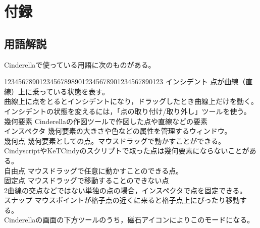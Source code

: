 \documentclass[papersize,a4paper,12pt,uplatex]{jsarticle}
\begin{document}
\section{付録}

\subsection{用語解説} 
Cinderellaで使っている用語に次のものがある。
\begin{tabbing}
1234567890123\=456789890123456789012\=34567890123\=\kill
インシデント  \>点が曲線（直線）上に乗っている状態を表す。\\
  \>曲線上に点をとるとインシデントになり，ドラッグしたとき曲線上だけを動く。\\
  \>インシデントの状態を変えるには，「点の取り付け/取り外し」ツールを使う。\\
幾何要素      \>Cinderellaの作図ツールで作図した点や直線などの要素\\
インスペクタ  \>幾何要素の大きさや色などの属性を管理するウィンドウ。\\
幾何点    \>幾何要素としての点。マウスドラッグで動かすことができる。\\
  \>CindyscriptやKeTCindyのスクリプトで取った点は幾何要素にならないことがある。\\
自由点  \>マウスドラッグで任意に動かすことのできる点。\\
固定点  \>マウスドラッグで移動することのできない点\\
  \>2曲線の交点などではない単独の点の場合，インスペクタで点を固定できる。\\ 
スナップ    \>マウスポイントが格子点の近くに来ると格子点上にぴったり移動する。\\
  \>Cinderellaの画面の下方ツールのうち，磁石アイコンによりこのモードになる。\\
 \end{tabbing}
 
\hypertarget{geometrytool}{}
\end{document}
